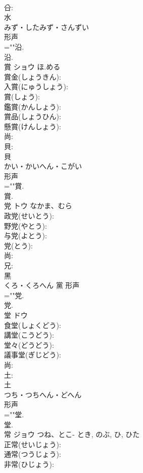 \documentclass[8pt]{extreport}
\begin{document}
\begin{CJK}{UTF8}{min}
\\	㕣: 
\\	水	
\\	みず・したみず・さんずい	
\\	形声 
\\	=""沿.
\\	沿.
\\	賞	ショウ	ほ.める		
\\	賞金(しょうきん): 
\\	入賞(にゅうしょう): 
\\	賞(しょう): 
\\	鑑賞(かんしょう): 
\\	賞品(しょうひん): 
\\	懸賞(けんしょう): 
\\	尚: 
\\	貝: 
\\	貝	
\\	かい・かいへん・こがい	
\\	形声 
\\	=""賞.
\\	賞.
\\	党	トウ	なかま、むら		
\\	政党(せいとう): 
\\	野党(やとう): 
\\	与党(よとう): 
\\	党(とう): 
\\	尚: 
\\	兄: 
\\	黑	
\\	くろ・くろへん	黨	形声 
\\	=""党.
\\	党.
\\	堂	ドウ			
\\	食堂(しょくどう): 
\\	講堂(こうどう): 
\\	堂々(どうどう): 
\\	議事堂(ぎじどう): 
\\	尚: 
\\	土: 
\\	土	
\\	つち・つちへん・どへん	
\\	形声 
\\	=""堂.
\\	堂.
\\	常	ジョウ	つね、とこ-	とき, のぶ, ひ, ひた	
\\	正常(せいじょう): 
\\	通常(つうじょう): 
\\	非常(ひじょう): 

\end{CJK}
\end{document}
